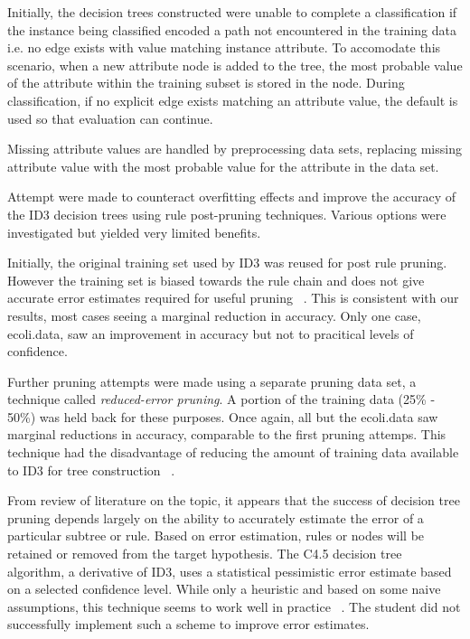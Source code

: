 \documentclass[10pt]{report}
\begin{document}
Initially, the decision trees constructed were unable to complete a
classification if the instance being classified encoded a path not
encountered in the training data i.e. no edge exists with value
matching instance attribute. To accomodate this scenario, when a new
attribute node is added to the tree, the most probable value of the
attribute within the training subset is stored in the node. During
classification, if no explicit edge exists matching an attribute
value, the default is used so that evaluation can continue.

Missing attribute values are handled by preprocessing data sets,
replacing missing attribute value with the most probable value for the
attribute in the data set.

Attempt were made to counteract overfitting effects and improve the
accuracy of the ID3 decision trees using rule post-pruning
techniques. Various options were investigated but yielded very limited
benefits.

Initially, the original training set used by ID3 was reused for post
rule pruning. However the training set is biased towards the rule
chain and does not give accurate error estimates required for useful
pruning ~\cite{Frank2000}. This is consistent with our results, most
cases seeing a marginal reduction in accuracy. Only one case,
ecoli.data, saw an improvement in accuracy but not to pracitical
levels of confidence.

Further pruning attempts were made using a separate pruning data set,
a technique called \textit{reduced-error pruning}. A portion of the training
data (25\% - 50\%) was held back for these purposes. Once again, all
but the ecoli.data saw marginal reductions in accuracy, comparable to
the first pruning attemps. This technique had the disadvantage of
reducing the amount of training data available to ID3 for tree
construction ~\cite{Frank2000}.

From review of literature on the topic, it appears
that the success of decision tree pruning depends largely on the
ability to accurately estimate the error of a particular subtree or
rule. Based on error estimation, rules or nodes will be retained or
removed from the target hypothesis. The C4.5 decision tree algorithm,
a derivative of ID3, uses a statistical pessimistic error estimate
based on a selected confidence level. While only a heuristic and based
on some naive assumptions, this technique seems to work well in
practice ~\cite{Frank2000}. The student did not successfully implement
such a scheme to improve error estimates.
\end{document}
